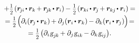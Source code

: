 \begin{otherlanguage}{russian}
\begin{multline}
+ \smalldisplaystyleonehalf \hspace{-0.2ex} \left( \scalebox{0.96}[1]{$\bm{r}_{\hspace{-0.2ex}j\hspace{-0.06ex}i} \hspace{-0.2ex} \dotp \bm{r}_k \hspace{-0.16ex} + \bm{r}_{\hspace{-0.2ex}j\hspace{-0.1ex}k} \hspace{-0.2ex} \dotp \bm{r}_i$} \right) \hspace{-0.16ex}
- \smalldisplaystyleonehalf \hspace{-0.2ex} \left( \scalebox{0.96}[1]{$\bm{r}_{ki} \hspace{-0.2ex} \dotp \bm{r}_{\hspace{-0.2ex}j} \hspace{-0.16ex} + \bm{r}_{kj} \hspace{-0.2ex} \dotp \bm{r}_i$} \right) \hspace{-0.1ex} = \\[-0.25em]
%
= \smalldisplaystyleonehalf \hspace{-0.2ex} \left(^{\mathstrut} \hspace{-0.2ex}
\partial_i ( \bm{r}_{\hspace{-0.2ex}j} \hspace{-0.2ex} \dotp \bm{r}_k ) \hspace{-0.16ex}
+ \partial_j ( \bm{r}_{i} \hspace{-0.2ex} \dotp \bm{r}_k ) \hspace{-0.16ex}
- \partial_k ( \bm{r}_{i} \hspace{-0.2ex} \dotp \bm{r}_{\hspace{-0.2ex}j} )
\hspace{-0.12ex} \right) \hspace{-0.4ex} = \\[-0.25em]
%
= \smalldisplaystyleonehalf \hspace{-0.16ex} \left(
\partial_i \hspace{.12ex} \textsl{g}_{j\hspace{-0.1ex}k} \hspace{-0.2ex}
+ \partial_j \hspace{.1ex} \textsl{g}_{ik} \hspace{-0.2ex}
- \partial_k \hspace{.12ex} \textsl{g}_{i\hspace{-0.1ex}j}
\right) \hspace{-0.4ex} .
\end{multline}


\end{otherlanguage}

